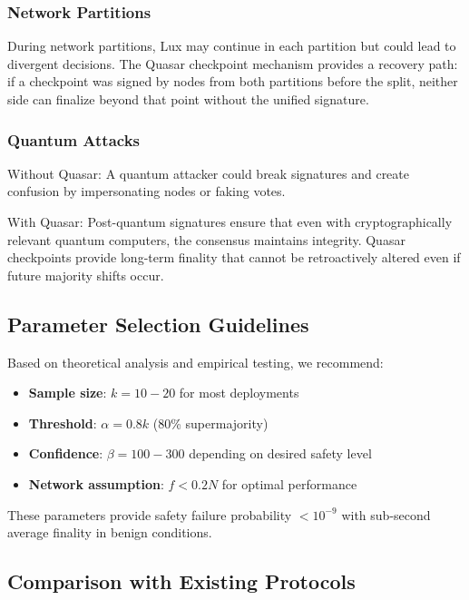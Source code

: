 \subsubsection{Network Partitions}

During network partitions, Lux may continue in each partition but could lead to divergent decisions. The Quasar checkpoint mechanism provides a recovery path: if a checkpoint was signed by nodes from both partitions before the split, neither side can finalize beyond that point without the unified signature.

\subsubsection{Quantum Attacks}

Without Quasar: A quantum attacker could break signatures and create confusion by impersonating nodes or faking votes.

With Quasar: Post-quantum signatures ensure that even with cryptographically relevant quantum computers, the consensus maintains integrity. Quasar checkpoints provide long-term finality that cannot be retroactively altered even if future majority shifts occur.

\subsection{Parameter Selection Guidelines}

Based on theoretical analysis and empirical testing, we recommend:

\begin{itemize}
\item \textbf{Sample size}: $k = 10-20$ for most deployments
\item \textbf{Threshold}: $\alpha = 0.8k$ (80\% supermajority)
\item \textbf{Confidence}: $\beta = 100-300$ depending on desired safety level
\item \textbf{Network assumption}: $f < 0.2N$ for optimal performance
\end{itemize}

These parameters provide safety failure probability $< 10^{-9}$ with sub-second average finality in benign conditions.

\subsection{Comparison with Existing Protocols}

